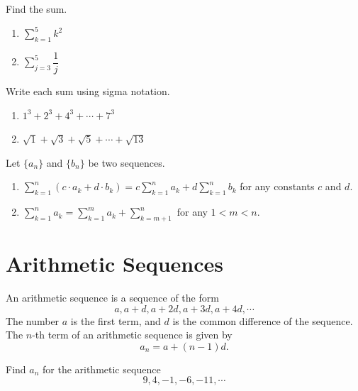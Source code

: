 \begin{example}
    Find the sum.
    \begin{enumerate}
        \item $\sum\limits_{k=1}^5 k^2$
        \item $\sum\limits_{j=3}^5\dfrac{1}{j}$
    \end{enumerate}
\end{example}

\begin{example}
    Write each sum using sigma notation.
    \begin{enumerate}
        \item $1^3+2^3+4^3+\cdots+7^3$
        \item $\sqrt{1}+\sqrt{3}+\sqrt{5}+\cdots+\sqrt{13}$
    \end{enumerate}
\end{example}

\begin{theorem} Let $\{a_n\}$ and $\{b_n\}$ be two sequences.
    \begin{enumerate}[itemsep=0.5\baselineskip, after=\vspace*{0.5\baselineskip}]
        \item $\sum\limits_{k=1}^n (c\cdot a_k+ d\cdot b_k)=c\sum\limits_{k=1}^n a_k+d\sum\limits_{k=1}^nb_k$ for any constants $c$ and $d$.
        \item $\sum\limits_{k=1}^na_k=\sum\limits_{k=1}^m a_k +\sum\limits_{k=m+1}^n$ for any $1<m<n$.
    \end{enumerate}
\end{theorem}

\section{Arithmetic Sequences}

\begin{definition}
 An arithmetic sequence is a sequence of the form
\[a, a+d, a+2d, a+3d, a+4d, \cdots\]
The number $a$ is the first term, and $d$ is the common difference of the sequence. The $n$-th term of an arithmetic sequence is given by
\[a_n=a+(n-1)d.\]
\end{definition}

\begin{example}
    Find $a_n$ for the arithmetic sequence
    \[9,4,-1,-6,-11,\cdots\]
\end{example}
\vspace*{6\baselineskip}

